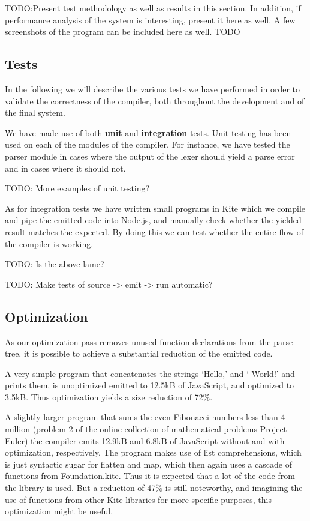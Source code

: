 TODO:Present test methodology as well as results in this section. In addition, if performance
analysis of the system is interesting, present it here as well.
A few screenshots of the program can be included here as well. TODO



\subsection{Tests}

In the following we will describe the various tests we have performed in order to validate the correctness of the compiler, both throughout the development and of the final system.

We have made use of both \textbf{unit} and \textbf{integration} tests. Unit testing has been used on each of the modules of the compiler. For instance, we have tested the parser module in cases where the output of the lexer should yield a parse error and in cases where it should not. 

TODO: More examples of unit testing?

As for integration tests we have written small programs in Kite which we compile and pipe the emitted code into Node.js, and manually check whether the yielded result matches the expected. By doing this we can test whether the entire flow of the compiler is working.

TODO: Is the above lame?

TODO: Make tests of  source -> emit -> run automatic?


\subsection{Optimization}
As our optimization pass removes unused function declarations from the parse tree, it is possible to achieve a substantial reduction of the emitted code.

A very simple program that concatenates the strings `Hello,' and ` World!' and prints them, is unoptimized emitted to 12.5kB of JavaScript, and optimized to 3.5kB. Thus optimization yields a size reduction of 72\%.

A slightly larger program that sums the even Fibonacci numbers less than 4 million (problem 2 of the online collection of mathematical problems Project Euler\cite{euler}) the compiler emits 12.9kB and 6.8kB of JavaScript without and with optimization, respectively. The program makes use of list comprehensions, which is just syntactic sugar for flatten and map, which then again uses a cascade of functions from Foundation.kite. Thus it is expected that a lot of the code from the library is used. But a reduction of 47\% is still noteworthy, and imagining the use of functions from other Kite-libraries for more specific purposes, this optimization might be useful. 


